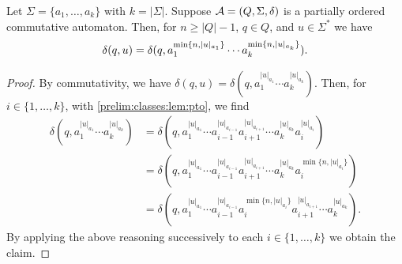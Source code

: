 \begin{corollary}\label{prelim:classes:cor:com-po}
	Let $\Sigma = \{a_1, \ldots, a_k\}$ with $k = |\Sigma|$.
	Suppose $\mathcal A = (Q, \Sigma, \delta)$
	is a  partially ordered commutative automaton.
	Then, for $n \ge |Q| - 1$, $q \in Q$, and $u \in \Sigma^*$ we have
	\begin{equation} \label{compl:eqn:com_pto_ST}
		\delta(q,u) = \delta(q,a_1^{\min\{n,|u|_{a_1}\}} \cdots a_k^{\min\{n,|u|_{a_k}\}}).
	\end{equation}
\end{corollary}
\begin{proof}
	By commutativity,
	we have $\delta(q, u) = \delta(q, a_1^{|u|_{a_1}} \cdots a_k^{|u|_{a_k}})$.
	Then, for $i \in \{1,\ldots,k\}$, with \cref{prelim:classes:lem:pto}, 
	we find 
	\begin{align*}
		\delta(q, a_1^{|u|_{a_1}} \cdots a_k^{|u|_{a_k}})
		& = \delta(q, a_1^{|u|_{a_1}} \cdots a_{i-1}^{|u|_{a_{i-1}}} a_{i+1}^{|u|_{a_{i+1}}} \cdots a_k^{|u|_{a_k}} a_i^{|u|_{a_i}}) \\
		& = \delta(q, a_1^{|u|_{a_1}} \cdots a_{i-1}^{|u|_{a_{i-1}}} a_{i+1}^{|u|_{a_{i+1}}} \cdots a_k^{|u|_{a_k}} a_i^{\min\{n,|u|_{a_i}\}}) \\ 
		& = 
		\delta(q, a_1^{|u|_{a_1}} \cdots a_{i-1}^{|u|_{a_{i-1}}} a_i^{\min\{n,|u|_{a_i}\}}a_{i+1}^{|u|_{a_{i+1}}} \cdots a_k^{|u|_{a_k}}).
	\end{align*}
	By applying the above reasoning successively to each $i \in \{1,\ldots,k\}$
	we obtain the claim.
\end{proof}
